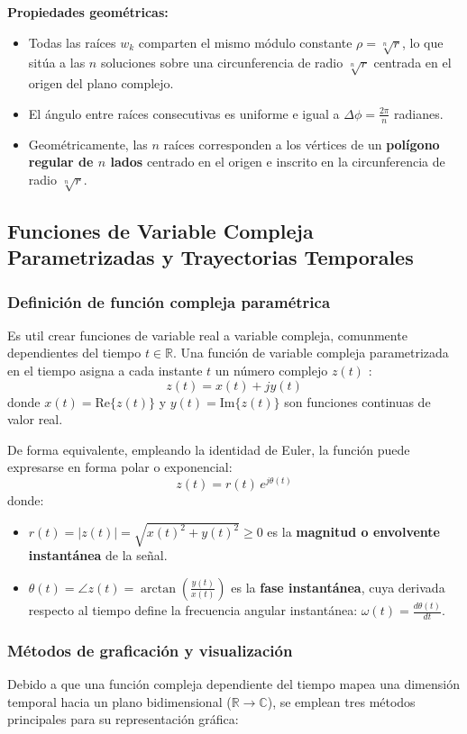 \documentclass[11pt,a4paper]{article}
\begin{document}
\textbf{Propiedades geométricas:}
\begin{itemize}
    \item Todas las raíces $w_k$ comparten el mismo módulo constante $\rho = \sqrt[n]{r}$, lo que sitúa a las $n$ soluciones sobre una circunferencia de radio $\sqrt[n]{r}$ centrada en el origen del plano complejo.
    \item El ángulo entre raíces consecutivas es uniforme e igual a $\Delta\phi = \frac{2\pi}{n}$ radianes.
    \item Geométricamente, las $n$ raíces corresponden a los vértices de un \textbf{polígono regular de $n$ lados} centrado en el origen e inscrito en la circunferencia de radio $\sqrt[n]{r}$.
\end{itemize}

\subsection{Funciones de Variable Compleja Parametrizadas y Trayectorias Temporales}

\subsubsection{Definición de función compleja paramétrica}
Es util crear funciones de variable real a variable compleja, comunmente dependientes del tiempo $t \in \mathbb{R}$. Una función de variable compleja parametrizada en el tiempo asigna a cada instante $t$ un número complejo $z(t)$ \cite{oppenheim1997}:
\[
z(t) = x(t) + jy(t)
\]
donde $x(t) = \text{Re}\{z(t)\}$ y $y(t) = \text{Im}\{z(t)\}$ son funciones continuas de valor real.

De forma equivalente, empleando la identidad de Euler, la función puede expresarse en forma polar o exponencial:
\[
z(t) = r(t) \, e^{j\theta(t)}
\]
donde:
\begin{itemize}
    \item $r(t) = |z(t)| = \sqrt{x(t)^2 + y(t)^2} \ge 0$ es la \textbf{magnitud o envolvente instantánea} de la señal.
    \item $\theta(t) = \angle z(t) = \arctan\left(\frac{y(t)}{x(t)}\right)$ es la \textbf{fase instantánea}, cuya derivada respecto al tiempo define la frecuencia angular instantánea: $\omega(t) = \frac{d\theta(t)}{dt}$.
\end{itemize}

\subsubsection{Métodos de graficación y visualización}
Debido a que una función compleja dependiente del tiempo mapea una dimensión temporal hacia un plano bidimensional ($\mathbb{R} \to \mathbb{C}$), se emplean tres métodos principales para su representación gráfica:
\end{document}
